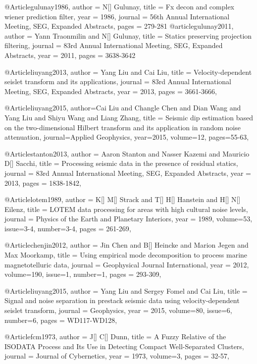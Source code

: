 @Article{gulunay1986,
  author =	 {N[] Gulunay},
  title = 	 {Fx decon and complex wiener prediction filter},
  year = 	 {1986},
  journal = 	 {56th Annual International Meeting, SEG, Expanded Abstracts},  
  pages =        {279-281}
}
@article{gulunay2011,
  author =	 {Yann Traonmilin and N[] Gulunay},
  title = 	 {Statics preserving projection filtering},
  journal =    {83rd Annual International Meeting, SEG, Expanded Abstracts},
  year = 	 {2011},
  pages =        {3638-3642}
}

@Article{liuyang2013,
  author = 	 {Yang Liu and Cai Liu},
  title = 	 {Velocity-dependent seislet transform and its applications},
  journal = 	 {83rd Annual International Meeting, SEG, Expanded Abstracts},
  year = 	 2013,
  pages =	 {3661-3666},
}

@Article{liuyang2015,
  author={Cai Liu and Changle Chen and Dian Wang and Yang Liu and Shiyu Wang and Liang Zhang},
  title = {Seismic dip estimation based on the two-dimensional Hilbert transform and its application in random noise attenuation},
  journal={Applied Geophysics},
  year=2015,
  volume=12,
  pages={55-63},
}

@Article{stanton2013,
  author = 	 {Aaron Stanton and Nasser Kazemi and Mauricio D[] Sacchi},
  title = 	 {Processing seismic data in the presence of residual statics},
  journal = 	 {83rd Annual International Meeting, SEG, Expanded Abstracts},
  year = 	 2013,
  pages =	 {1838-1842},
}

@Article{lotem1989,
  author =	 { K[] M[] Strack and T[] H[] Hanstein and H[] N[] Eilenz},
  title =	 {LOTEM data processing for areas with high cultural noise levels},
  journal =	 {Physics of the Earth and Planetary Interiors},
  year =	 1989,
  volume=53,
  issue=3-4,
  number=3-4,
  pages =	 {261-269},
}

@Article{chenjin2012,
  author =	 {Jin Chen and B[] Heincke and Marion Jegen and Max Moorkamp},
  title =	 {Using empirical mode decomposition to process marine magnetotelluric data},
  journal =	 {Geophysical Journal International},
  year =	 2012,
  volume=190,
  issue=1,
  number=1,
  pages =	 {293-309},
}


@Article{liuyang2015,
  author =	 { Yang Liu and Sergey Fomel and Cai Liu},
  title =	 {Signal and noise separation in prestack seismic data using velocity-dependent seislet transform},
  journal =	 {Geophysics},
  year =	 2015,
  volume=80,
  issue=6,
  number=6,
  pages =	 {WD117-WD128},
}

@Article{fcm1973,
  author =	 { J[] C[] Dunn},
  title =	 {A Fuzzy Relative of the ISODATA Process and Its Use in Detecting Compact Well-Separated Clusters},
  journal =	 {Journal of Cybernetics},
  year =	 1973,
  volume=3,
  pages =	 {32-57},
}

